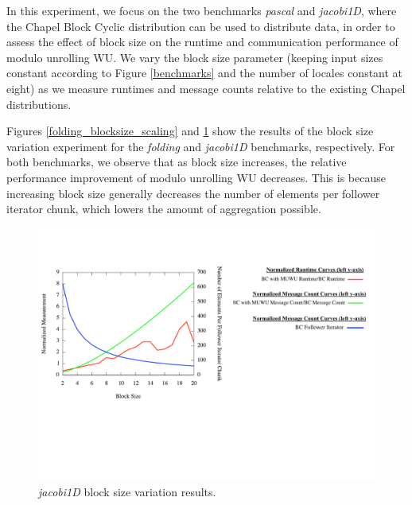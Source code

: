 In this experiment, we focus on the two benchmarks \textit{pascal} and \textit{jacobi1D}, where the Chapel Block Cyclic distribution can be used to distribute data, in order to assess the effect of block size on the runtime and communication performance of modulo unrolling WU. We vary the block size parameter (keeping input sizes constant according to Figure \ref{benchmarks} and the number of locales constant at eight) as we measure runtimes and message counts relative to the existing Chapel distributions. 

Figures \ref{folding_blocksize_scaling} and \ref{jacobi1D_blocksize_scaling} show the results of the block size variation experiment for the \textit{folding} and \textit{jacobi1D} benchmarks, respectively. For both benchmarks, we observe that as block size increases, the relative performance improvement of modulo unrolling WU decreases. This is because increasing block size generally decreases the number of elements per follower iterator chunk, which lowers the amount of aggregation possible. 

\begin{figure}
\begin{center}
\includegraphics[width=\linewidth]{./Figures/blocksize_variation_exp/jacobi-1d.pdf}
\caption{\textit{jacobi1D} block size variation results.}
\label{jacobi1D_blocksize_scaling}
\end{center}
\end{figure}